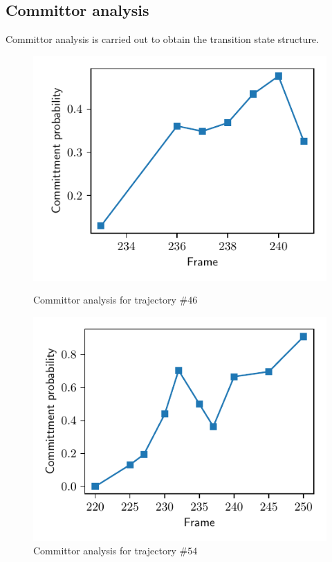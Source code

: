 \documentclass[%
preprint,
 amsmath,amssymb,
 aps,
prb,
]{revtex4-2}
\begin{document}
\subsection{Committor analysis}
Committor analysis is carried out to obtain the transition state structure.
\begin{figure}[ht!]
\centering
\begin{minipage}[b]{.4\textwidth}
\includegraphics[scale=0.75]{figures/dist46.pdf}
\caption{Committor analysis for trajectory $\#46$}\label{fig:comm46}
\end{minipage}\qquad
\begin{minipage}[b]{.4\textwidth}
\includegraphics[scale=0.75]{figures/dist54.pdf}
\caption{Committor analysis for trajectory $\#54$}\label{fig:comm54}
\end{minipage}
\end{figure}
\end{document}
